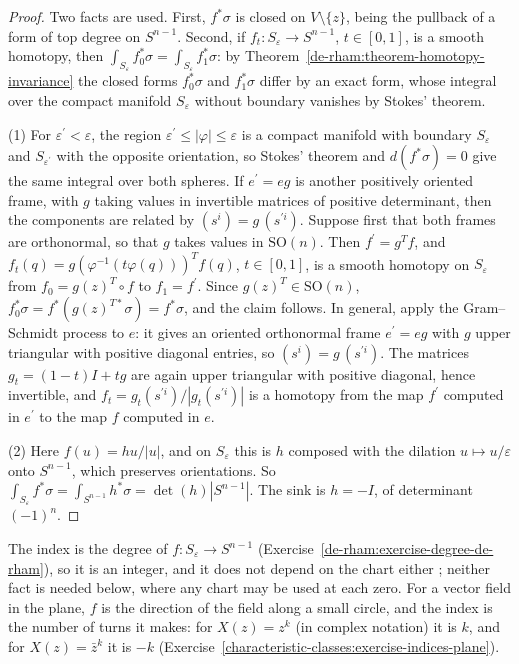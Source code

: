 \begin{proof}
Two facts are used. First, $f^*\sigma$ is closed on $V \setminus \{z\}$, being the pullback of a form of top degree on $S^{n-1}$. Second, if $f_t \colon S_\varepsilon \to S^{n-1}$, $t \in [0, 1]$,
is a smooth homotopy, then $\int_{S_\varepsilon}f_0^*\sigma = \int_{S_\varepsilon}f_1^*\sigma$: by Theorem~\ref{de-rham:theorem-homotopy-invariance} the closed forms $f_0^*\sigma$ and $f_1^*\sigma$ differ by an
exact form, whose integral over the compact manifold $S_\varepsilon$ without boundary vanishes by Stokes' theorem.

(1) For $\varepsilon^{\prime} < \varepsilon$, the region $\varepsilon^{\prime} \leq |\varphi| \leq \varepsilon$ is a compact manifold with boundary $S_\varepsilon$ and $S_{\varepsilon^{\prime}}$ with the opposite orientation, so
Stokes' theorem and $d(f^*\sigma) = 0$ give the same integral over both spheres. If $e^{\prime} = eg$ is another positively oriented frame, with $g$ taking values in invertible matrices of
positive determinant, then the components are related by $(s^i) = g\,(s^{\prime i})$. Suppose first that both frames are orthonormal, so that $g$ takes values in $\mathrm{SO}(n)$. Then
$f^{\prime} = g^Tf$, and $f_t(q) = g(\varphi^{-1}(t\varphi(q)))^Tf(q)$, $t \in [0, 1]$, is a smooth homotopy on $S_\varepsilon$ from $f_0 = g(z)^T \circ f$ to $f_1 = f^{\prime}$. Since
$g(z)^T \in \mathrm{SO}(n)$, $f_0^*\sigma = f^*(g(z)^{T*}\sigma) = f^*\sigma$, and the claim follows. In general, apply the Gram--Schmidt process to $e$: it gives an oriented orthonormal frame
$e^{\prime} = eg$ with $g$ upper triangular with positive diagonal entries, so $(s^i) = g\,(s^{\prime i})$. The matrices $g_t = (1 - t)I + tg$ are again upper triangular with positive
diagonal, hence invertible, and $f_t = g_t(s^{\prime i})/|g_t(s^{\prime i})|$ is a homotopy from the map $f^{\prime}$ computed in $e^{\prime}$ to the map $f$ computed in $e$.

(2) Here $f(u) = hu/|u|$, and on $S_\varepsilon$ this is $h$ composed with the dilation $u \mapsto u/\varepsilon$ onto $S^{n-1}$, which preserves orientations. So
$\int_{S_\varepsilon}f^*\sigma = \int_{S^{n-1}}h^*\sigma = \det(h)|S^{n-1}|$. The sink is $h = -I$, of determinant $(-1)^n$.
\end{proof}

The index is the degree of $f \colon S_\varepsilon \to S^{n-1}$ (Exercise~\ref{de-rham:exercise-degree-de-rham}), so it is an integer, and it does not depend on the chart either
\cite[Chapter 6]{milnor-differential-viewpoint}; neither fact is needed below, where any chart may be used at each zero. For a vector field in the plane, $f$ is the direction of the field
along a small circle, and the index is the number of turns it makes: for $X(z) = z^k$ (in complex notation) it is $k$, and for $X(z) = \bar z^k$ it is $-k$
(Exercise~\ref{characteristic-classes:exercise-indices-plane}).

